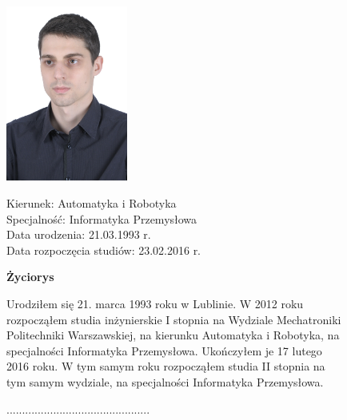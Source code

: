 \begin{figure}[ht]
\begin{doublespacing}
	\begin{minipage}[b]{0.4\linewidth}
		\includegraphics[width=4cm]{img/cv/me}
	\end{minipage}
	\begin{minipage}[b]{0.5\linewidth}
		Kierunek:  Automatyka i Robotyka \\
		Specjalność:  Informatyka Przemysłowa \\
		Data urodzenia:  21.03.1993 r. \\
		Data rozpoczęcia studiów:  23.02.2016 r. \\
	\end{minipage}
	
	\hspace{2cm}
	
	\begin{center}
		\huge{\textbf{Życiorys}} \\
	\end{center}

Urodziłem się 21. marca 1993 roku w Lublinie. W 2012 roku rozpocząłem studia inżynierskie I stopnia na Wydziale Mechatroniki Politechniki Warszawskiej, na kierunku Automatyka i Robotyka, na specjalności Informatyka Przemysłowa. Ukończyłem je 17 lutego 2016 roku. W tym samym roku rozpocząłem studia II stopnia na tym samym wydziale, na specjalności Informatyka Przemysłowa. \\

	\vspace{2cm}
	\begin{flushright}
				.............................................. \\
	\end{flushright}
\end{doublespacing}
\end{figure}


